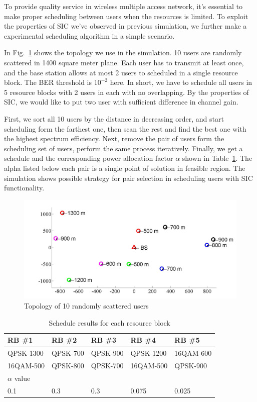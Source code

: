 To provide quality service in wireless multiple access network, it's essential
to make proper scheduling between users when the resources is limited. 
To exploit the properties of SIC we've observed in previous simulation, we
further make a experimental scheduling algorithm in a simple scenario.

In Fig.~\ref{fig_sim_topo} shows the topology we use in the simulation.
10 users are randomly scattered in 1400 square meter plane.
Each user has to transmit at least once, and the base station allows at most
2 users to scheduled in a single resource block.
The BER threshold is $10^{-2}$ here.
In short, we have to schedule all users in 5 resource blocks with 2 users in
each with no overlapping. 
By the properties of SIC, we would like to put two user with sufficient difference
in channel gain.

First, we sort all 10 users by the distance in decreasing order, and start 
scheduling form the farthest one, then scan the rest and find the best one
with the highest spectrum efficiency.
Next, remove the pair of users form the scheduling set of users, perform
the same process iteratively.
Finally, we get a schedule and the corresponding power allocation factor $\alpha$
shown in Table~\ref{tb_sim_schedule}.
The alpha listed below each pair is a single point of solution in feasible region.
The simulation shows possible strategy for pair selection in scheduling users
with SIC functionality.

\begin{figure}[t]
\begin{center}
\includegraphics[width=0.95\columnwidth ,angle=0]{figure/topoSimple.jpg}
\caption{Topology of 10 randomly scattered users}
\label{fig_sim_topo}
\end{center}
\end{figure}

\begin{table}[t]
\footnotesize
\caption{Schedule results for each resource block}
    \begin{tabular}{| l | l | l | l | l |}
    \hline
    RB \#1 & RB \#2 & RB \#3 & RB \#4 & RB \#5\\ \hline
    QPSK-1300   &QPSK-700 &QPSK-900    &QPSK-1200  &16QAM-600\\ \hline
    16QAM-500  &QPSK-800 &QPSK-700    &16QAM-500 &QPSK-900\\ \hline \hline
    $\alpha$ value &     &           &     & \\ \hline
    0.1&0.3&0.3&0.075&0.025\\ \hline
    \end{tabular}
\label{tb_sim_schedule}
\end{table}
